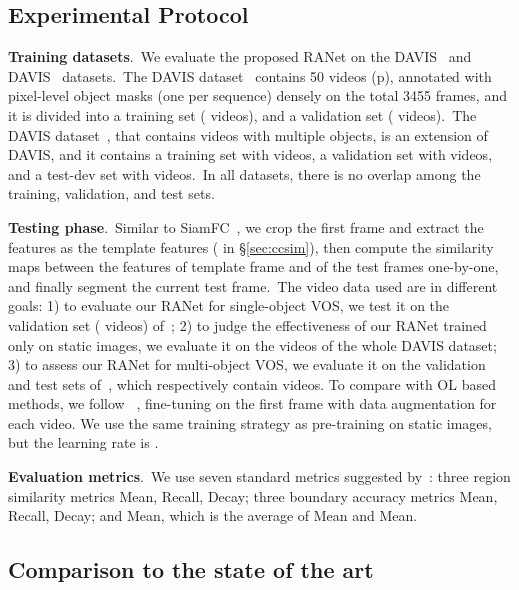 \documentclass[10pt,twocolumn,letterpaper]{article}
\begin{document}
\subsection{Experimental Protocol}
\label{sec:protocol}

\noindent
\textbf{Training datasets}.\ We evaluate the proposed RANet on the DAVIS~\cite{davis2016} and DAVIS~\cite{davis2017} datasets.\ The DAVIS dataset~\cite{davis2016} contains 50 videos (p), annotated with pixel-level object masks (one per sequence) densely on the total 3455 frames, and it is divided into a training set ( videos), and a validation set ( videos).\ The DAVIS dataset~\cite{davis2017}, that contains videos with multiple objects, is an extension of DAVIS, and it contains a training set with  videos, a validation set with  videos, and a test-dev set with  videos.\ In all datasets, there is no overlap among the training, validation, and test sets.


\noindent
\textbf{Testing phase}.\
Similar to SiamFC~\cite{siamfc}, we crop the first frame and extract the features as the template features ( in \S\ref{sec:ccsim}), then compute the similarity maps between the features of template frame and of the test frames one-by-one, and finally segment the current test frame.\ The video data used are in different goals: 1) to evaluate our RANet for single-object VOS, we test it on the validation set ( videos) of~\cite{davis2016}; 2) to judge the effectiveness of our RANet trained only on static images, we evaluate it on the  videos of the whole DAVIS dataset; 3)
to assess our RANet for multi-object VOS, we evaluate it on the validation and test sets of~\cite{davis2017}, which respectively contain  videos. 
To compare with OL based methods, we follow ~\cite{osvos,masktrack}, fine-tuning on the first frame with data augmentation for each video. We use the same training strategy as pre-training on static images, but the learning rate is . 







\noindent
\textbf{Evaluation metrics}.\ We use seven standard metrics suggested by~\cite{davis2016}: three region similarity metrics  Mean,  Recall,  Decay; three boundary accuracy metrics  Mean,  Recall,  Decay; and  Mean, which is the average of  Mean and  Mean.

\subsection{Comparison to the state of the art}
\label{sec:compare}
\end{document}
